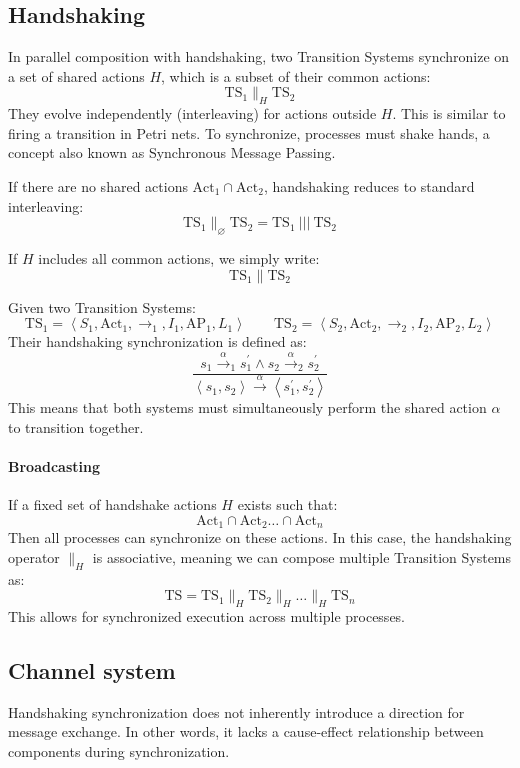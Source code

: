 \subsection{Handshaking}
In parallel composition with handshaking, two Transition Systems synchronize on a set of shared actions $H$, which is a subset of their common actions:
\[\text{TS}_1 \parallel_H \text{TS}_2\]    
They evolve independently (interleaving) for actions outside $H$.
This is similar to firing a transition in Petri nets.
To synchronize, processes must shake hands, a concept also known as Synchronous Message Passing.

If there are no shared actions $\text{Act}_1\cap \text{Act}_2$, handshaking reduces to standard interleaving:
\[\text{TS}_1\parallel_{\varnothing}\text{TS}_2=\text{TS}_1\:|||\:\text{TS}_2\]

If $H$ includes all common actions, we simply write:
\[\text{TS}_1\parallel\text{TS}_2\]

Given two Transition Systems:
\[\text{TS}_1=\left\langle S_1, \text{Act}_1, \rightarrow_1, I_1,\text{AP}_1, L_1\right\rangle \qquad \text{TS}_2=\left\langle S_2, \text{Act}_2, \rightarrow_2, I_2,\text{AP}_2, L_2\right\rangle\]    
Their handshaking synchronization is defined as: 
\[\dfrac{s_1\xrightarrow{\alpha}_1s_1^\prime\land s_2\xrightarrow{\alpha}_2s_2^\prime}{\left\langle s_1,s_2\right\rangle \xrightarrow{\alpha}\left\langle s_1^\prime,s_2^\prime\right\rangle}\]
This means that both systems must simultaneously perform the shared action $\alpha$ to transition together.

\paragraph*{Broadcasting}
If a fixed set of handshake actions $H$ exists such that: 
\[\text{Act}_1\cap \text{Act}_2 \dots \cap \text{Act}_n\]
Then all processes can synchronize on these actions.
In this case, the handshaking operator $\parallel_H$ is associative, meaning we can compose multiple Transition Systems as:
\[\text{TS}=\text{TS}_1\parallel_H\text{TS}_2\parallel_H\dots \parallel_H\text{TS}_n\]
This allows for synchronized execution across multiple processes.

\subsection{Channel system}
Handshaking synchronization does not inherently introduce a direction for message exchange. 
In other words, it lacks a cause-effect relationship between components during synchronization.

